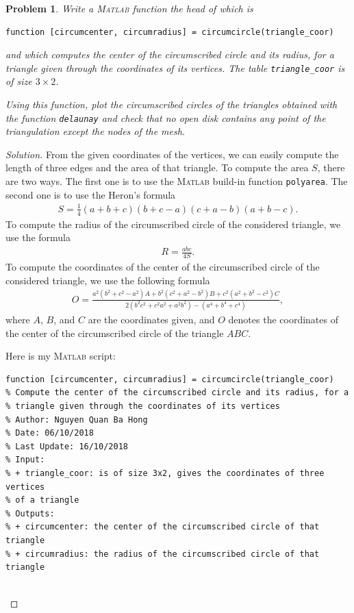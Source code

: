 \documentclass[11pt,a4paper,center,notitlepage]{article}
\numberwithin{equation}{section}
\newtheorem{prob}{Problem}[section]
\begin{document}
\begin{prob}\label{prob2.1}
Write a \textsc{Matlab} function the head of which is
\begin{verbatim}
function [circumcenter, circumradius] = circumcircle(triangle_coor)
\end{verbatim}
and which computes the center of the circumscribed circle and its radius, for a triangle given through the coordinates of its vertices. The table \verb|triangle_coor| is of size $3\times 2$.

Using this function, plot the circumscribed circles of the triangles obtained with the function \verb|delaunay| and check that no open disk contains any point of the triangulation except the nodes of the mesh.
\end{prob}

\begin{proof}[Solution]
From the given coordinates of the vertices, we can easily compute the length of three edges and the area of that triangle. To compute the area $S$, there are two ways. The first one is to use the \textsc{Matlab} build-in function \verb|polyarea|. The second one is to use the Heron's formula
\begin{align}
S = \frac{1}{4}\left( {a + b + c} \right)\left( {b + c - a} \right)\left( {c + a - b} \right)\left( {a + b - c} \right).
\end{align}
To compute the radius of the circumscribed circle of the considered triangle, we use the formula
\begin{align}
R = \frac{{abc}}{{4S}}.
\end{align}
To compute the coordinates of the center of the circumscribed circle of the considered triangle, we use the following formula
\begin{align}
O = \frac{{{a^2}\left( {{b^2} + {c^2} - {a^2}} \right)A + {b^2}\left( {{c^2} + {a^2} - {b^2}} \right)B + {c^2}\left( {{a^2} + {b^2} - {c^2}} \right)C}}{{2\left( {{b^2}{c^2} + {c^2}{a^2} + {a^2}{b^2}} \right) - \left( {{a^4} + {b^4} + {c^4}} \right)}} , 
\end{align}
where $A$, $B$, and $C$ are the coordinates given, and $O$ denotes the coordinates of the center of the circumscribed circle of the triangle $ABC$.

Here is my \textsc{Matlab} script:
\begin{verbatim}
function [circumcenter, circumradius] = circumcircle(triangle_coor)
% Compute the center of the circumscribed circle and its radius, for a
% triangle given through the coordinates of its vertices
% Author: Nguyen Quan Ba Hong
% Date: 06/10/2018
% Last Update: 16/10/2018
% Input:
% + triangle_coor: is of size 3x2, gives the coordinates of three vertices
% of a triangle
% Outputs:
% + circumcenter: the center of the circumscribed circle of that triangle
% + circumradius: the radius of the circumscribed circle of that triangle


\end{verbatim}
\end{proof}
\end{document}
